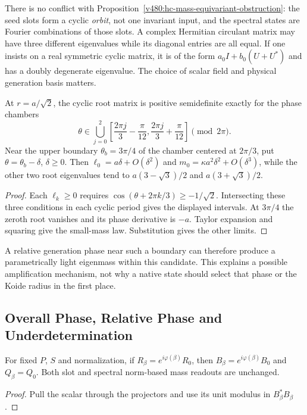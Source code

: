 There is no conflict with Proposition~\ref{v480:hc-mass-equivariant-obstruction}:
the seed slots form a cyclic \emph{orbit}, not one invariant input,
and the spectral states are Fourier combinations of those slots.
A complex Hermitian circulant matrix may have three different
eigenvalues while its diagonal entries are all equal. If one insists
on a real symmetric cyclic matrix, it is of the form
$a_0I+b_0(U+U^*)$ and has a doubly degenerate eigenvalue.
The choice of scalar field and physical generation basis matters.

\begin{proposition}
\label{v480:generation-phase-chambers}
At $r=a/\sqrt2$, the cyclic root matrix is positive semidefinite
exactly for the phase chambers
\[
 \theta\in\bigcup_{j=0}^2
 \left[\frac{2\pi j}{3}-\frac{\pi}{12},
       \frac{2\pi j}{3}+\frac{\pi}{12}\right]
 \pmod{2\pi}.
\]
Near the upper boundary $\theta_b=3\pi/4$ of the chamber centered
at $2\pi/3$, put $\theta=\theta_b-\delta$, $\delta\geq0$.
Then $\ell_0=a\delta+O(\delta^2)$ and
$m_0=\kappa a^2\delta^2+O(\delta^3)$, while the other two
root eigenvalues tend to $a(3-\sqrt3)/2$ and $a(3+\sqrt3)/2$.
\end{proposition}
\begin{proof}
Each $\ell_k\geq0$ requires
$\cos(\theta+2\pi k/3)\geq-1/\sqrt2$.
Intersecting these three conditions in each cyclic period gives
the displayed intervals. At $3\pi/4$ the zeroth root vanishes
and its phase derivative is $-a$. Taylor expansion and squaring
give the small-mass law. Substitution gives the other limits.
\end{proof}

A relative generation phase near such a boundary can therefore
produce a parametrically light eigenmass within this candidate.
This explains a possible amplification mechanism, not why a native
state should select that phase or the Koide radius in the first place.

\subsection{Overall Phase, Relative Phase and Underdetermination}
\label{v480:generation-phase}

\begin{proposition}
\label{v480:generation-global-phase}
For fixed $P$, $S$ and normalization, if
$R_\beta=e^{i\varphi(\beta)}R_0$, then
$B_\beta=e^{i\varphi(\beta)}B_0$ and $Q_\beta=Q_0$.
Both slot and spectral norm-based mass readouts are unchanged.
\end{proposition}
\begin{proof}
Pull the scalar through the projectors and use its unit modulus in
$B_\beta^*B_\beta$.
\end{proof}

